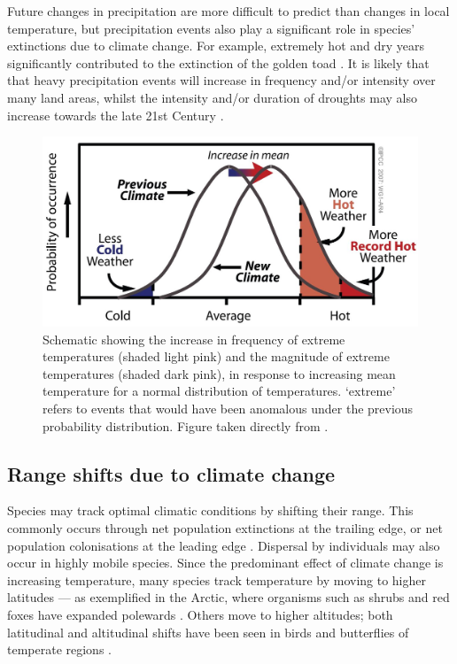 \documentclass[12pt,a4paper,]{report}
\theoremstyle{definition}
\theoremstyle{definition}
\theoremstyle{definition}
\theoremstyle{remark}
\begin{document}
Future changes in precipitation are more difficult to predict than
changes in local temperature, but precipitation events also play a
significant role in species' extinctions due to climate change. For
example, extremely hot and dry years significantly contributed to the
extinction of the golden toad \citep{pounds_biological1999}. It is
likely that that heavy precipitation events will increase in frequency
and/or intensity over many land areas, whilst the intensity and/or
duration of droughts may also increase towards the late 21st Century
\citep{ipcc2013}.

\begin{figure}
\centering
\includegraphics{figs/Fig1.1.jpg}
\caption{\label{fig:fig-1-1}Schematic showing the increase in frequency of extreme
temperatures (shaded light pink) and the magnitude of extreme
temperatures (shaded dark pink), in response to increasing mean
temperature for a normal distribution of temperatures. `extreme' refers
to events that would have been anomalous under the previous probability
distribution. Figure taken directly from \citet{ipcc_climate2007}.}
\end{figure}

\subsection{Range shifts due to climate
change}\label{range-shifts-due-to-climate-change}

Species may track optimal climatic conditions by shifting their range.
This commonly occurs through net population extinctions at the trailing
edge, or net population colonisations at the leading edge
\citep{parmesan_poleward1999}. Dispersal by individuals may also occur
in highly mobile species. Since the predominant effect of climate change
is increasing temperature, many species track temperature by moving to
higher latitudes --- as exemplified in the Arctic, where organisms such
as shrubs and red foxes have expanded polewards
\citep{hersteinsson_interspecific1992, sturm_climate2001}. Others move
to higher altitudes; both latitudinal and altitudinal shifts have been
seen in birds and butterflies of temperate regions
\citep{hill_responses2002, parmesan_poleward1999, thomas_birds1999}.
\end{document}
